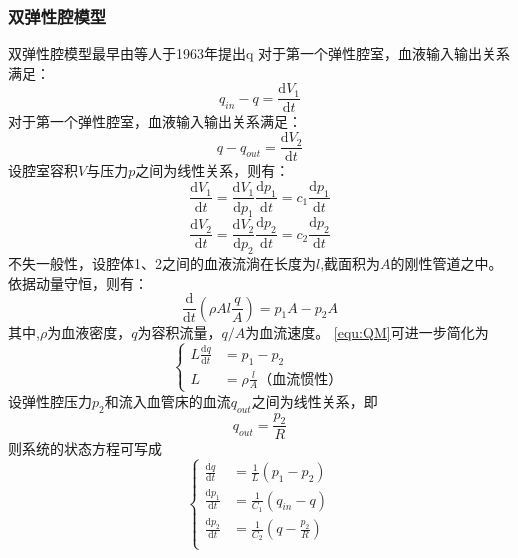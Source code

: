\subsubsection{双弹性腔模型}
双弹性腔模型最早由等人于1963年提出q
对于第一个弹性腔室，血液输入输出关系满足：
\begin{equation}
    \label{equ:QS1}
    q_{in}-q=\frac{\mathrm{d} V_{1}}{\mathrm{d} t}
\end{equation}
对于第一个弹性腔室，血液输入输出关系满足：
\begin{equation}
    \label{equ:QS2}
    q-q_{out}=\frac{\mathrm{d} V_{2}}{\mathrm{d} t}
\end{equation}
设腔室容积$V$与压力$p$之间为线性关系，则有：
\begin{equation}
    \label{equ:QSV1}
    \frac{\mathrm{d} V_{1}}{\mathrm{d} t}
    =\frac{\mathrm{d} V_{1}}{\mathrm{d} p_{1}}\frac{\mathrm{d} p_{1}}{\mathrm{d} t}
    =c_{1}\frac{\mathrm{d} p_{1}}{\mathrm{d} t}
\end{equation}
\begin{equation}
    \label{equ:QSV2}
    \frac{\mathrm{d} V_{2}}{\mathrm{d} t}
    =\frac{\mathrm{d} V_{2}}{\mathrm{d} p_{2}}\frac{\mathrm{d} p_{2}}{\mathrm{d} t}
    =c_{2}\frac{\mathrm{d} p_{2}}{\mathrm{d} t}
\end{equation}
不失一般性，设腔体1、2之间的血液流淌在长度为$l$,截面积为$A$的刚性管道之中。依据动量守恒，则有：
\begin{equation}
    \label{equ:QM}
    \frac{\mathrm{d}}{\mathrm{d} t}\left ( \rho Al\frac{q}{A} \right )=p_{1}A-p_{2}A
\end{equation}
其中,$\rho$为血液密度，$q$为容积流量，$q/A$为血流速度。
\autoref{equ:QM}可进一步简化为
\begin{equation}
    \left \{
    \begin{aligned}
        L\frac{\mathrm{d} q}{\mathrm{d} t} &= p_{1}-p_{2} \\
        L &=\rho \frac{l}{A} \text{（血流惯性）}
    \end{aligned}
    \right.
\end{equation}
设弹性腔压力$p_{2}$和流入血管床的血流$q_{out}$之间为线性关系，即
\begin{equation}
    \label{equ:pq}
    q_{out}=\frac{p_{2}}{R}
\end{equation}
则系统的状态方程可写成
\begin{equation}
    \left \{
    \begin{aligned}
        \frac{\mathrm{d} q}{\mathrm{d} t} &= \frac{1}{L}(p_{1}-p_{2}) \\
        \frac{\mathrm{d} p_{1}}{\mathrm{d} t} &= \frac{1}{C_{1}}(q_{in}-q) \\
        \frac{\mathrm{d} p_{2}}{\mathrm{d} t} &= \frac{1}{C_{2}}(q-\frac{p_{2}}{R}) \\
    \end{aligned}
    \right.
\end{equation}
